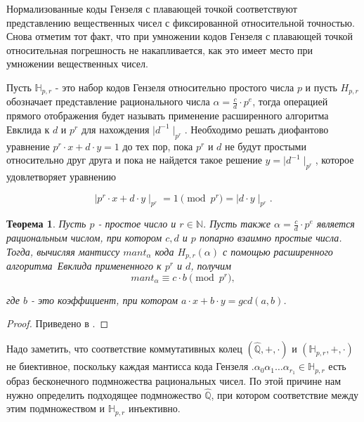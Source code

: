\documentclass[master, och, diploma, times]{sty/SCWorks}
\theoremstyle{plain}
\newtheorem{thethm}{Теорема}[section]
\theoremstyle{definition}
\numberwithin{equation}{section}
\begin{document}
Нормализованные коды Гензеля с плавающей точкой соответствуют представлению вещественных чисел с фиксированной относительной точностью. Снова отметим тот факт, что при умножении кодов Гензеля с плавающей точкой относительная погрешность не накапливается, как это имеет место при умножении вещественных чисел.

Пусть $\mathbb{H}_{p,r}$ - это набор кодов Гензеля относительно простого числа $p$ и пусть $H_{p,r}$ обозначает представление рационального числа $\alpha=\frac{c}{d}\cdot p^e$, тогда операцией прямого отображения будет называть применение расширенного алгоритма Евклида к $d$ и $p^r$ для нахождения $\mid d^{-1} \mid_{p^r}$. Необходимо решать диофантово уравнение $p^r \cdot x + d \cdot y = 1$ до тех пор, пока $p^r$ и $d$ не будут простыми относительно друг друга и пока не найдется такое решение $y=\mid d^{-1} \mid_{p^r}$, которое удовлетворяет уравнению

\begin{equation}
\mid p^r \cdot x + d \cdot y \mid_{p^r} = 1 \pmod{p^r} = \mid d \cdot y \mid_{p^r}.
\end{equation}


\begin{thethm}\label{th:forward_mapping}
Пусть $p$ - простое число и $r \in \mathbb{N}$. Пусть также $\alpha=\frac{c}{d} \cdot p^e$ является рациональным числом, при котором $c, d$ и $p$ попарно взаимно простые числа. Тогда, вычисляя мантиссу $mant_{\alpha}$ кода $H_{p,r}(\alpha)$ с помощью \mbox{расширенного} \mbox{алгоритма Евклида} примененного к $p^r$ и $d$, получим
\begin{equation}
mant_{\alpha} \equiv c \cdot b \pmod {p^r},
\end{equation}

\noindent где $b$ - это коэффициент, при котором $a\cdot x+b\cdot y = gcd(a,b)$.
\end{thethm}

\begin{proof}
Приведено в \cite{bib:numbers:miola}.
\end{proof}


Надо заметить, что соответствие коммутативных колец $(\hat{\mathbb{Q}},+,\cdot)$ и $(\mathbb{H}_{p,r},+,\cdot)$ не биективное, поскольку каждая мантисса кода Гензеля $.\alpha_0\alpha_1\dots\alpha_{r_1} \in \mathbb{H}_{p,r}$ есть образ бесконечного подмножества рациональных чисел. По этой причине нам нужно определить подходящее подмножество $\hat{\mathbb{Q}}$, при котором соответствие между этим подмножеством и $\mathbb{H}_{p,r}$ \mbox{инъективно}.
\end{document}
